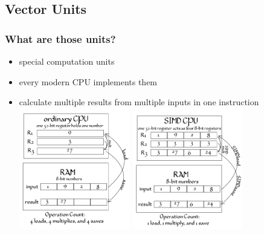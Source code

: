 \documentclass[compress]{beamer}
\begin{document}
\subsection{Vector Units}
        \begin{frame}
        \frametitle{What are those units?}
        \begin{itemize}
            \item special computation units
                \item every modern CPU implements them
                \item calculate multiple results from multiple inputs in one instruction \newline 
                    \includegraphics[width=0.38\textwidth]{Non-SIMD_cpu_diagram.png}     
                    \includegraphics[width=0.38\textwidth]{SIMD_cpu_diagram.png}
        \end{itemize}

\end{frame}
\end{document}
